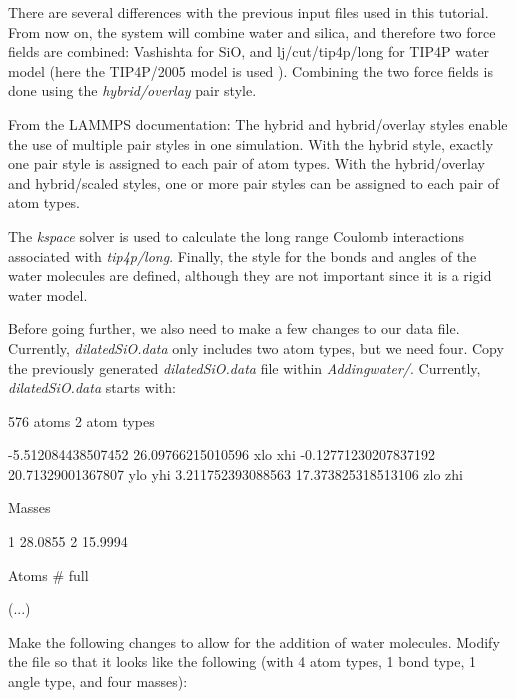 \noindent There are several differences with the previous input files
used in this tutorial. From now on, the system will combine water and silica,
and therefore two force fields are combined: Vashishta for
SiO, and lj/cut/tip4p/long for TIP4P water model (here 
the TIP4P/2005 model is used \cite{abascal2005general}).
Combining the two force fields is done using the \textit{hybrid/overlay} pair style.

\begin{tcolorbox}[colback=mylightblue!5!white,colframe=mylightblue!75!black,title=About hybrid and hybrid/overlay pair style]

\vspace{0.25cm} \noindent From the LAMMPS documentation:
The hybrid and hybrid/overlay styles enable the use
of multiple pair styles in one simulation. With the hybrid style,
exactly one pair style is assigned to each pair of atom types.
With the hybrid/overlay and hybrid/scaled styles, one or more pair
styles can be assigned to each pair of atom types.
\end{tcolorbox}

\noindent The \textit{kspace} solver is used to calculate the long
range Coulomb interactions associated with \textit{tip4p/long}.
Finally, the style for the bonds and angles
of the water molecules are defined, although they are not important
since it is a rigid water model.

\vspace{0.25cm} \noindent Before going further, we also need to make a few changes to our data file.
Currently, \textit{dilatedSiO.data} only includes two atom types, but
we need four. Copy the previously generated \textit{dilatedSiO.data}
file within \textit{Addingwater/}. Currently, \textit{dilatedSiO.data} starts with:

\begin{lcverbatim}
576 atoms
2 atom types

-5.512084438507452 26.09766215010596 xlo xhi
-0.12771230207837192 20.71329001367807 ylo yhi
3.211752393088563 17.373825318513106 zlo zhi

Masses

1 28.0855
2 15.9994

Atoms # full

(...)
\end{lcverbatim}

\noindent Make the following changes to allow for the addition of water
molecules. Modify the file so that it looks like the following 
(with 4 atom types, 1 bond type, 1 angle type, and four masses):


